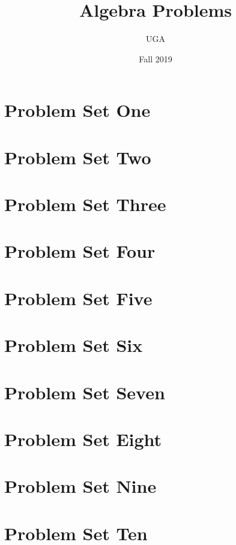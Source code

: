 

\title{Algebra Problems}
\author{UGA}
\date{Fall 2019}



\maketitle

\tableofcontents
\newpage

\section{Problem Set One}


% 

\section{Problem Set Two}

\newpage

\section{Problem Set Three}

\newpage

\section{Problem Set Four}

\newpage

\section{Problem Set Five}

\newpage

\section{Problem Set Six}

\newpage

\section{Problem Set Seven}

\newpage

\section{Problem Set Eight}

\newpage

\section{Problem Set Nine}

\newpage

\section{Problem Set Ten}

\newpage

